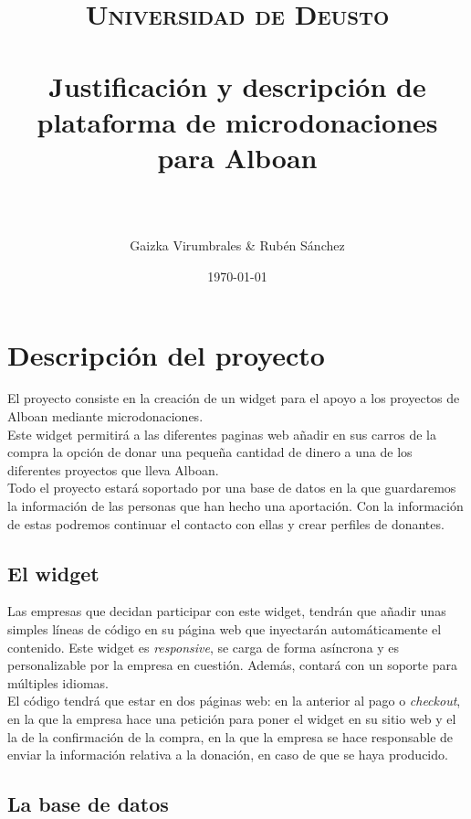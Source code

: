 \documentclass[paper=a4, fontsize=12pt]{scrartcl} %
\title{	
\normalfont \normalsize 
\textsc{Universidad de Deusto} \\ [25pt] %
\horrule{0.5pt} \\[0.4cm] %
\huge Justificación y descripción de plataforma de microdonaciones para Alboan\\ %
\horrule{2pt} \\[0.5cm] %
\author{Gaizka Virumbrales \& Rubén Sánchez} %
}
\date{\normalsize\today} %
\numberwithin{equation}{section} %
\numberwithin{figure}{section} %
\numberwithin{table}{section} %
\begin{document}
\maketitle %


\section{Descripción del proyecto}

El proyecto consiste en la creación de un widget para el apoyo a los proyectos de Alboan mediante microdonaciones.\\
Este widget permitirá a las diferentes paginas web añadir en sus carros de la compra la opción de donar una pequeña cantidad de dinero a una de los diferentes proyectos que lleva Alboan.\\
Todo el proyecto estará soportado por una base de datos en la que guardaremos la información de las personas que han hecho una aportación. Con la información de estas podremos continuar el contacto con ellas y crear perfiles de donantes.


\subsection{El widget}
Las empresas que decidan participar con este widget, tendrán que añadir unas simples líneas de código en su página web que inyectarán automáticamente el contenido. Este widget es \textit{responsive}, se carga de forma asíncrona y es personalizable por la empresa en cuestión. Además, contará con un soporte para múltiples idiomas.\\
El código tendrá que estar en dos páginas web: en la anterior al pago o \textit{checkout}, en la que la empresa hace una petición para poner el widget en su sitio web y el la de la confirmación de la compra, en la que la empresa se hace responsable de enviar la información relativa a la donación, en caso de que se haya producido.


\subsection{La base de datos}
\end{document}
